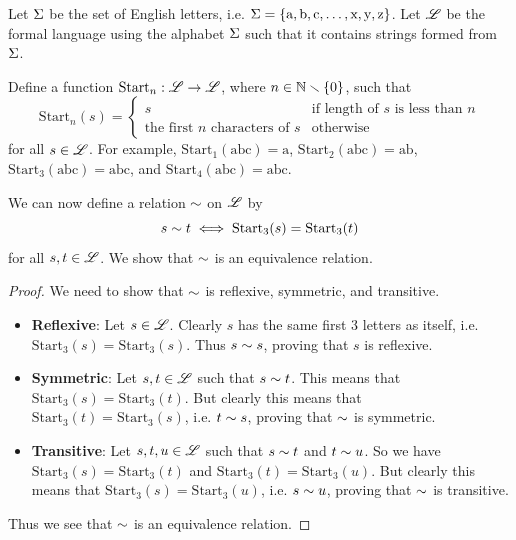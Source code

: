 \begin{example}
    \setlength{\parindent}{1.5em}

    Let $\Sigma$ be the set of English letters, i.e. $\Sigma = \{\text{a}, \text{b}, \text{c}, \dots, \text{x}, \text{y}, \text{z}\}$. Let $\mathscr{L}$ be the formal language using the alphabet $\Sigma$ such that it contains strings formed from $\Sigma$.

    Define a function $\mathrm{Start}_n: \mathscr{L} \to \mathscr{L}$, where $n \in \mathbb{N} \smallsetminus \{0\}$, such that
    \[
        \mathrm{Start}_n(s) = \begin{cases}
            s & \text{if length of } s \text{ is less than } n\\
            \text{the first } n \text{ characters of } s & \text{otherwise}
        \end{cases}
    \]
    for all $s \in \mathscr{L}$. For example, $\mathrm{Start}_1(\text{abc}) = \text{a}$, $\mathrm{Start}_2(\text{abc}) = \text{ab}$, $\mathrm{Start}_3(\text{abc}) = \text{abc}$, and $\mathrm{Start}_4(\text{abc}) = \text{abc}$.

    We can now define a relation $\sim$ on $\mathscr{L}$ by
    \[
        s\mathrel{\sim}t \iff \mathrm{Start}_3(s) = \mathrm{Start}_3(t)
    \]
    for all $s, t \in \mathscr{L}$. We show that $\sim$ is an equivalence relation.
    \begin{proof}
        We need to show that $\sim$ is reflexive, symmetric, and transitive.
        \begin{itemize}
            \item \textbf{Reflexive}: Let $s \in \mathscr{L}$. Clearly $s$ has the same first 3 letters as itself, i.e. $\mathrm{Start}_3(s) = \mathrm{Start}_3(s)$. Thus $s \mathrel{\sim} s$, proving that $s$ is reflexive.
            \item \textbf{Symmetric}: Let $s, t \in \mathscr{L}$ such that $s \mathrel{\sim} t$. This means that $\mathrm{Start}_3(s) = \mathrm{Start}_3(t)$. But clearly this means that $\mathrm{Start}_3(t) = \mathrm{Start}_3(s)$, i.e. $t \mathrel{\sim} s$, proving that $\sim$ is symmetric.
            \item \textbf{Transitive}: Let $s, t, u \in \mathscr{L}$ such that $s \mathrel{\sim} t$ and $t \mathrel{\sim} u$. So we have $\mathrm{Start}_3(s) = \mathrm{Start}_3(t)$ and $\mathrm{Start}_3(t) = \mathrm{Start}_3(u)$. But clearly this means that $\mathrm{Start}_3(s) = \mathrm{Start}_3(u)$, i.e. $s \mathrel{\sim} u$, proving that $\sim$ is transitive.
        \end{itemize}
        Thus we see that $\sim$ is an equivalence relation.
    \end{proof}
\end{example}

